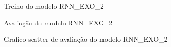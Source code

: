 \documentclass[	12pt, Times, openright, twoside, a4paper, english, brazil]{abntex2}
\begin{document}
                \begin{figure}[!ht]
                  \caption{Treino do modelo RNN\_EXO\_2 \label{fig:case1_rnn_exo_2_train} }
                \end{figure}

                \begin{figure}[!ht]
                  \caption{Avaliação do modelo RNN\_EXO\_2 \label{fig:case1_rnn_exo_2_val} }
                \end{figure}
                \begin{figure}[!ht]
                  \caption{Grafico scatter de avaliação do modelo RNN\_EXO\_2 \label{fig:case1_rnn_exo_2_val_scatter} }
                \end{figure}
\end{document}
